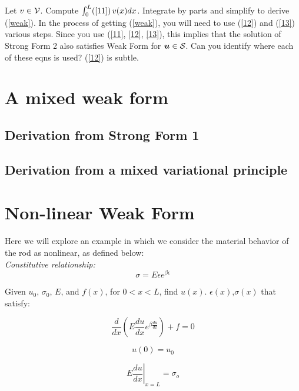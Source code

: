 \documentclass[12pt,american]{article}
\def\beq{\begin{equation}}
\def\eeq{\end{equation}}
\def \u{\mbox{\boldmath{$u$}}}
\def \sigo{\sigma_{o}}
\def \cS{{\cal{S}}}
\def \cV{{\cal{V}}}
\begin{document}
\begin{tcolorbox}[title= Exercise: Derive the weak form from the strong form] 
Let $v \in \cV$.  Compute $\int_0^L (\ref{11})\,  v(x) dx$.  
Integrate by parts and simplify to derive (\ref{weak}).  
In the process of getting (\ref{weak}), you will need to use (\ref{12}) and (\ref{13}) 
various steps.  Since you use (\ref{11}, \ref{12}, \ref{13}), this implies that the 
solution of Strong Form 2 also satisfies Weak Form for $\u \in \cS$.  
Can you identify where each of these eqns is used? 
(\ref{12}) is subtle.
\end{tcolorbox}




\section{A mixed weak form}

\subsection{Derivation from Strong Form 1}

\subsection{Derivation from a mixed variational principle}





\section{Non-linear Weak Form}

Here we will explore an example in which we consider the material behavior of the rod as nonlinear, as defined below:
\\
{\em Constitutive relationship:}
\beq
\sigma = E \epsilon e^{\beta \epsilon}
\eeq

\begin{tcolorbox}[title= Nonlinear Strong Form]
Given $u_0$, $ \sigma_0 $, $E$, and $f(x)$, for $0<x<L$, find $u(x)$. $\epsilon(x)$,$\sigma(x)$ that satisfy:

\beq
\frac{d}{dx} \left( E \frac{du}{dx} e^{\beta \frac{du}{dx}} \right) + f = 0
\eeq

\beq
u(0) = u_0
\eeq

\beq
\left. E\frac{du}{dx} \right|_{x=L} = \sigo
\eeq

\end{tcolorbox}
\end{document}
